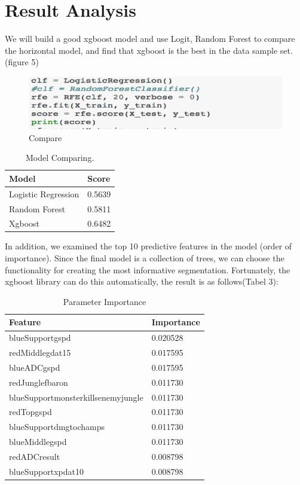 \documentclass[fleqn,10pt]{wlscirep}
\newcommand{\li}{\uline{\hspace{0.5em}}}
\begin{document}
\section*{Result Analysis}

We will build a good xgboost model and use Logit, Random Forest to compare the horizontal model, and find that xgboost is the best in the data sample set.(figure 5)
\begin{figure}[ht]
\centering
\includegraphics[width=\linewidth]{5.png}
\caption{Compare}
\label{fig:5}
\end{figure}

\begin{table}[ht]
\centering
\begin{tabular}{|p{5cm}|p{5cm}|}
\hline
Model & Score\\
\hline
Logistic Regression&
0.5639\\
\hline
Random Forest&
0.5811\\
\hline
Xgboost&
0.6482\\
\hline
\end{tabular}
\caption{\label{tab:example}Model Comparing.}
\end{table}

In addition, we examined the top 10 predictive features in the model (order of importance). Since the final model is a collection of trees, we can choose the functionality for creating the most informative segmentation. Fortunately, the xgboost library can do this automatically, the result is as follows(Tabel 3):

\begin{table}[ht]
\centering
\begin{tabular}{|p{5cm}|p{5cm}|}
\hline
Feature & Importance\\
\hline
blue\li Support\li gspd&
0.020528\\
\hline
red\li Middle\li gdat15 &
0.017595\\
\hline
blue\li ADC\li gspd&
0.017595\\
\hline
red\li Jungle\li fbaron&
0.011730\\
\hline
blue\li Support\li monsterkillsenemyjungle&
0.011730\\
\hline
red\li Top\li gspd&
0.011730\\
\hline
blue\li Support\li dmgtochamps&
0.011730\\
\hline
blue\li Middle\li gspd&
0.011730\\
\hline
red\li ADC\li result&
0.008798\\
\hline
blue\li Support\li xpdat10&
0.008798\\

\hline
\end{tabular}
\caption{\label{tab:example}Parameter Importance}
\end{table}
\end{document}
